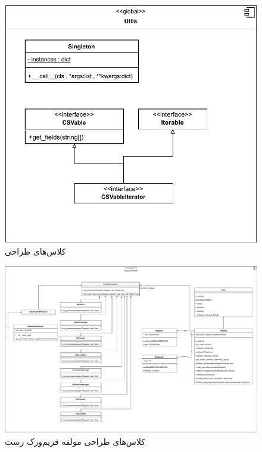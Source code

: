 \begin{figure}[ht!]
	\centering
	\includegraphics[scale=0.8]{figs/design-class/utils.pdf}
	\caption{کلاس‌های طراحی }
\end{figure}
\FloatBarrier
\newpage

\eject \pdfpagewidth=16in \pdfpageheight=12in
\begin{figure}[ht!]
	\centering
	\includegraphics[scale=0.8]{figs/design-class/rest.pdf}
	\caption{کلاس‌های طراحی مولفه فریم‌ورک رست}
\end{figure}
\FloatBarrier
\newpage

